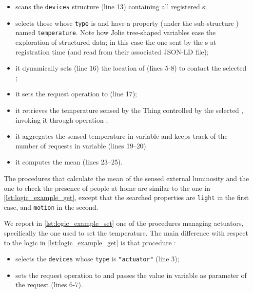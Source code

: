 \begin{itemize}
  \item scans the \lstinline{devices} structure (line 13) containing all
  registered s;
  \item selects those whose {\small\texttt{type}} is  and have
  a property (under the sub-structure ) named
  \lstinline{temperature}. Note how Jolie tree-shaped variables ease the
  exploration of structured data; in this case the one sent by the
  s at registration time (and read from their associated JSON-LD
  file);
  \item it dynamically sets (line 16) the location of 
  (lines 5-8) to contact the selected ;
  \item it sets the request operation to  (line 17);
  \item it retrieves the temperature sensed by the Thing controlled by the
  selected , invoking it through operation ;
  \item it aggregates the sensed temperature in variable  and keeps
  track of the number of requests in variable  (lines 19--20)
  \item it computes the mean  (lines 23--25).
\end{itemize}
%

The procedures that calculate the mean of the sensed external luminosity and
the one to check the presence of people at home are similar to the one in
\cref{lst:logic_example_get}, except that the searched properties are
\lstinline{light} in the first case, and \lstinline{motion} in the second.

We report in \cref{lst:logic_example_set} one of the procedures managing
actuators, specifically the one used to set the temperature. The main
difference with respect to the logic in \cref{lst:logic_example_get} is that
procedure :

\begin{itemize}
  \item selects the \lstinline{devices} whose {\small \texttt{type}} is
  \lstinline{"actuator"} (line 3);
  \item sets the request operation to  and passes the value
  in variable  as parameter of the request
  (lines 6-7).
\end{itemize}

